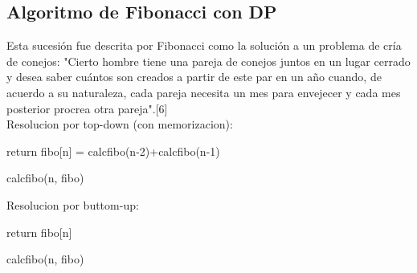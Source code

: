 \documentclass[spanish]{article}
\begin{document}
	\subsection{Algoritmo de Fibonacci con DP}
	Esta sucesión fue descrita por Fibonacci como la solución a un problema de cría de conejos: "Cierto hombre tiene una pareja de conejos juntos en un lugar cerrado y desea saber cuántos son creados a partir de este par en un año cuando, de acuerdo a su naturaleza, cada pareja necesita un mes para envejecer y cada mes posterior procrea otra pareja".[6]\\
	Resolucion por top-down (con memorizacion):\\	
	\begin{algorithm}[H]
		return fibo[n] = calcfibo(n-2)+calcfibo(n-1)\;
		\caption{calcfibo(n, fibo)}
	\end{algorithm}
	Resolucion por buttom-up:\\	
	\begin{algorithm}[H]
		return fibo[n]\;
		\caption{calcfibo(n, fibo)}
	\end{algorithm}			
\end{document}
